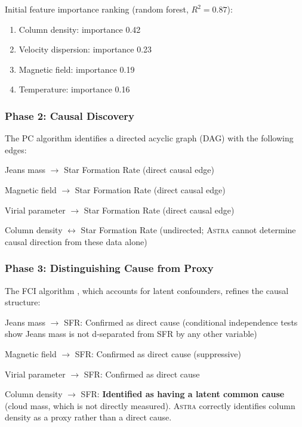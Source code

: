 \documentclass[usenatbib]{rasti}
\newcommand{\astra}{\textsc{Astra}\xspace}
\newcommand{\pc}{PC\xspace}
\newcommand{\fci}{FCI\xspace}
\begin{document}
Initial feature importance ranking (random forest, $R^{2} = 0.87$):
\begin{enumerate}
  \item[(i)] Column density: importance 0.42
  \item[(ii)] Velocity dispersion: importance 0.23
  \item[(iii)] Magnetic field: importance 0.19
  \item[(iv)] Temperature: importance 0.16
\end{enumerate}

\subsubsection{Phase 2: Causal Discovery}
\label{sec:tc6:phase2}

The \pc algorithm identifies a directed acyclic graph (DAG) with the following edges:
\begin{description}
  \item Jeans mass $\rightarrow$ Star Formation Rate (direct causal edge)
  \item Magnetic field $\rightarrow$ Star Formation Rate (direct causal edge)
  \item Virial parameter $\rightarrow$ Star Formation Rate (direct causal edge)
  \item Column density $\leftrightarrow$ Star Formation Rate (undirected; \astra cannot determine causal direction from these data alone)
\end{description}

\subsubsection{Phase 3: Distinguishing Cause from Proxy}
\label{sec:tc6:phase3}

The \fci algorithm \citep{Zhang2008}, which accounts for latent confounders, refines the causal structure:
\begin{description}
  \item Jeans mass $\rightarrow$ SFR: Confirmed as direct cause (conditional independence tests show Jeans mass is not d-separated from SFR by any other variable)
  \item Magnetic field $\rightarrow$ SFR: Confirmed as direct cause (suppressive)
  \item Virial parameter $\rightarrow$ SFR: Confirmed as direct cause
  \item Column density $\rightarrow$ SFR: \textbf{Identified as having a latent common cause} (cloud mass, which is not directly measured). \astra correctly identifies column density as a proxy rather than a direct cause.
\end{description}
\end{document}

